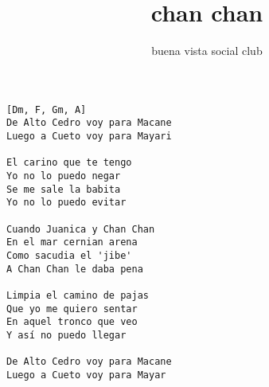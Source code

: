 \author{buena vista social club}
\title{chan chan}
\maketitle
\begin{verbatim}
[Dm, F, Gm, A]
De Alto Cedro voy para Macane
Luego a Cueto voy para Mayari

El carino que te tengo
Yo no lo puedo negar
Se me sale la babita
Yo no lo puedo evitar

Cuando Juanica y Chan Chan
En el mar cernian arena
Como sacudia el 'jibe'
A Chan Chan le daba pena

Limpia el camino de pajas
Que yo me quiero sentar
En aquel tronco que veo
Y así no puedo llegar

De Alto Cedro voy para Macane
Luego a Cueto voy para Mayar
\end{verbatim}
